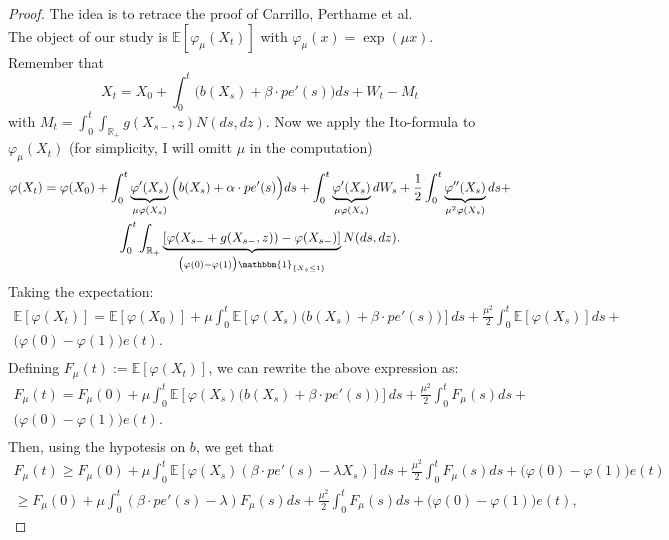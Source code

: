 \begin{proof}
The idea is to retrace the proof of Carrillo, Perthame et al.\\
The object of our study is $\mathbb{E}[\varphi_\mu(X_t)]$ with $\varphi_\mu(x)=\exp(\mu x)$. \\
Remember that
\[X_t = X_0 + \int_0^t \Big( b(X_s) + \beta\cdot p e'(s) \Big) ds + W_t - M_t\]
with $M_t=\int_0^t\int_{\mathbb{R}_+}g(X_{s-},z)N(ds,dz)$.
Now we apply the Ito-formula to $\varphi_\mu(X_t)$ (for simplicity, I will omitt $\mu$ in the computation)
\begin{multline*}
\varphi(X_t)=\varphi(X_0)+\int_0^t\underbrace{\varphi'(X_s)}_{\mu\varphi(X_s)} \Big( b(X_s) + \alpha\cdot p e'(s) \Big) ds+\int_0^t \underbrace{\varphi'(X_s)}_{\mu \varphi(X_s)}dW_s+\frac{1}{2}\int_0^t \underbrace{\varphi''(X_s)}_{\mu^2 \varphi(X_s)} ds+\\
\int_0^t \int_{\mathbb{R_+}}\underbrace{[\varphi(X_{s-}+g(X_{s-},z))-\varphi(X_{s-})]}_{\big( \varphi(0)-\varphi(1) \big) \mathbbm{1}_{ \left\{ X_s\leq 1 \right\} }}N(ds,dz).\\
\end{multline*}
Taking the expectation:
\begin{multline*}
\mathbb{E}\left[\varphi(X_t)\right]=\mathbb{E}\left[\varphi(X_0)\right]+\mu\int_0^t\mathbb{E}\left[\varphi(X_s) \Big( b(X_s) + \beta\cdot p e'(s) \Big)\right]ds+\frac{\mu^2}{2}\int_0^t \mathbb{E}\left[\varphi(X_s)\right] ds+\\
\Big(\varphi(0)-\varphi(1)\Big)e(t).\\
\end{multline*}
Defining $F_\mu(t):=\mathbb{E}[\varphi(X_t)]$, we can rewrite the above expression as:
\begin{multline*}
F_\mu(t)=F_\mu(0)+\mu\int_0^t\mathbb{E}\left[\varphi(X_s) \Big( b(X_s) + \beta\cdot p e'(s) \Big) \right]ds+\frac{\mu^2}{2}\int_0^t F_\mu(s)ds+\\
\Big(\varphi(0)-\varphi(1)\Big)e(t).\\
\end{multline*}
Then, using the hypotesis on $b$, we get that
\begin{multline*}
F_\mu(t)\geq F_\mu(0)+\mu\int_0^t\mathbb{E}\left[\varphi(X_s) (\beta \cdot p e'(s)-\lambda X_s )\right]ds+\frac{\mu^2}{2}\int_0^t F_\mu(s)ds+\Big(\varphi(0)-\varphi(1)\Big)e(t) \nonumber\\
\geq F_\mu(0)+\mu\int_0^t(\beta \cdot p e'(s)-\lambda )F_\mu(s)ds+\frac{\mu^2}{2}\int_0^t F_\mu(s)ds+\Big(\varphi(0)-\varphi(1)\Big)e(t),

\end{multline*}
\end{proof}

